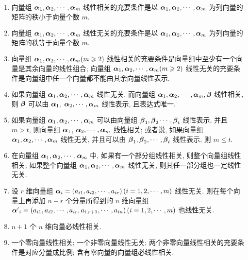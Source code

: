 \begin{enumerate}[label=(\arabic{*})]
    \item 向量组 $ \vb*{\alpha}_{1}, \vb*{\alpha}_{2}, \cdots, \vb*{\alpha}_{m} $ 线性相关的充要条件是以  $\vb*{\alpha}_{1}, \vb*{\alpha}_{2}, \cdots, \vb*{\alpha}_{m} $ 为列向量的矩阵的秩小于向量个数 $ m $.
    \item 向量组 $ \vb*{\alpha}_{1}, \vb*{\alpha}_{2}, \cdots, \vb*{\alpha}_{m} $ 线性无关的充要条件是以  $\vb*{\alpha}_{1}, \vb*{\alpha}_{2}, \cdots, \vb*{\alpha}_{m} $ 为列向量的矩阵的秩等于向量个数 $ m $.
    \item 向量组 $ \vb*{\alpha}_{1}, \vb*{\alpha}_{2}, \cdots, \vb*{\alpha}_{m}(m \geqslant 2) $ 线性相关的充要条件是向量组中至少有一个向量是其余向量的线性组合; 向量组 $ \vb*{\alpha}_{1}, \vb*{\alpha}_{2}, \cdots, \vb*{\alpha}_{m}(m \geqslant 2) $ 线性无关的充要条件是向量组中任一个向量都不能由其余向量线性表示.
    \item 如果向量组 $ \vb*{\alpha}_{1}, \vb*{\alpha}_{2}, \cdots, \vb*{\alpha}_{m} $ 线性无关, 而向量组  $\vb*{\alpha}_{1}, \vb*{\alpha}_{2}, \cdots, \vb*{\alpha}_{m}, \vb*{\beta} $ 线性相关, 则 $ \vb*{\beta}$ 可以由 $ \vb*{\alpha}_{1}$, $\vb*{\alpha}_{2}, \cdots, \vb*{\alpha}_{m} $ 线性表示, 且表达式唯一.
    \item 如果向量组 $ \vb*{\alpha}_{1}, \vb*{\alpha}_{2}, \cdots, \vb*{\alpha}_{m} $ 可以由向量组 $ \vb*{\beta}_{1}, \vb*{\beta}_{2} \cdots, \vb*{\beta}_{t} $ 线性表示, 并且 $ m>t $, 则向量组 $ \vb*{\alpha}_{1}$, $\vb*{\alpha}_{2}, \cdots, \vb*{\alpha}_{m} $ 线性相关; 或者说, 如果向量组 $ \vb*{\alpha}_{1}, \vb*{\alpha}_{2}, \cdots, \vb*{\alpha}_{m} $ 线性无关, 并且可以由 $ \vb*{\beta}_{1}, \vb*{\beta}_{2}, \cdots, \vb*{\beta}_{t} $ 线性表示, 则 $ m \leqslant t $.
    \item 在向量组 $ \vb*{\alpha}_{1}, \vb*{\alpha}_{2}, \cdots, \vb*{\alpha}_{m} $ 中, 如果有一个部分组线性相关, 则整个向量组线性相关; 如果整个向量组 $ \vb*{\alpha}_{1}, \vb*{\alpha}_{2}, \cdots, \vb*{\alpha}_{m} $ 线性无关, 则其任一部分组也一定线性无关.
    \item 设 $ r $ 维向量组 $ \vb*{\alpha}_{i}=\left(a_{i 1}, a_{i 2}, \cdots, a_{i r}\right)(i=1,2, \cdots, m) $ 线性无关, 则在每个向量上再添加 $ n-r $ 个分量所得到的 $ n $ 维向量组 $ \vb*{\alpha}^{\prime}{ }_{i}=\left(a_{i 1}, a_{i 2}, \cdots, a_{i r}, a_{i, r+1}, \cdots, a_{i n}\right)(i=1,2, \cdots , m)$ 也线性无关.
    \item $n+1 $ 个 $ n $ 维向量必线性相关.
    \item 一个零向量线性相关; 一个非零向量线性无关; 两个非零向量线性相关的充要条件是对应分量成比例; 含有零向量的向量组必线性相关.

\end{enumerate}

